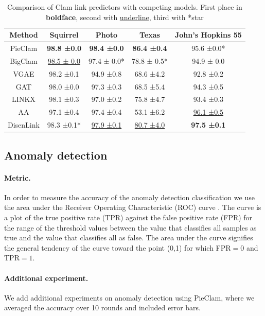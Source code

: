 \documentclass[letterpaper]{article} %
\begin{document}
\begin{table}[t]
    \centering
    \begin{tabular}{|c|c|c|c|c|}
        \hline
        Method  & Squirrel        & Photo           & Texas        & John's Hopkins 55 \\
        \hline
        PieClam & \textbf{98.8 ±0.0} & \textbf{98.4 ±0.0}     &   \textbf{86.4 ±0.4}           & 95.6 ±0.0*     \\
        \hline
        BigClam & \underline{98.5 ± 0.0}& 97.4 ± 0.0*  & 78.8 ± 0.5*& 94.9 ± 0.0 \\
        VGAE    &   98.2 ±0.1   &94.9 ±0.8  & 68.6 ±4.2 & 92.8 ±0.2 \\
        GAT     &   98.0 ±0.0   &97.3 ±0.3  & 68.5 ±5.4 &   94.3 ±0.5\\
        LINKX   &   98.1 ±0.3   &97.0 ±0.2  & 75.8 ±4.7 &   93.4 ±0.3 \\
        AA      &   97.1 ±0.4 &97.4 ±0.4  & 53.1 ±6.2 &  \underline{96.1 ±0.5}  \\
        DisenLink & 98.3 ±0.1* & \underline{97.9 ±0.1} & \underline{80.7 ±4.0} &   \textbf{97.5 ±0.1} \\
        \hline
    \end{tabular}
    \caption{Comparison of Clam link predictors with competing models. First place in \textbf{boldface}, second with \underline{underline}, third with *star}
    \label{table: link table}
\end{table}


\subsection{Anomaly detection}


\paragraph{Metric.} In order to measure the accuracy of the anomaly detection classification we use the area under the Receiver Operating Characteristic (ROC) curve \cite{peterson1954roc}. The curve is a plot of the true positive rate (TPR) against the false positive rate (FPR) for the range of the threshold values between the value that classifies all samples as true and the value that classifies all as false. The area under the curve signifies the general tendency of the curve toward the point (0,1) for which FPR$= 0$ and TPR$= 1$.


\paragraph{Additional experiment.} We add additional experiments on anomaly detection using PieClam, where we averaged the accuracy over 10 rounds and included error bars.
\end{document}
